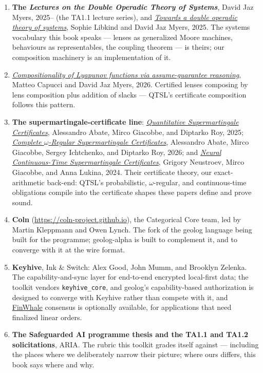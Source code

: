 \begin{enumerate}
  \item \textbf{The \emph{Lectures on the Double Operadic Theory of
    Systems}}, David Jaz Myers, 2025-- (the TA1.1 lecture series), and
    \href{https://arxiv.org/abs/2505.18329}{\emph{Towards a double
    operadic theory of systems}}, Sophie Libkind and David Jaz Myers,
    2025. The systems vocabulary this book speaks --- lenses as
    generalized Moore machines, behaviours as representables, the
    coupling theorem --- is theirs; our composition machinery is an
    implementation of it.
  \item \href{https://arxiv.org/abs/2604.03017}{\emph{Compositionality
    of Lyapunov functions via assume-guarantee reasoning}}, Matteo
    Capucci and David Jaz Myers, 2026. Certified lenses composing by
    lens composition plus addition of slacks --- QTSL's certificate
    composition follows this pattern.
  \item \textbf{The supermartingale-certificate line}:
    \href{https://arxiv.org/abs/2504.05065}{\emph{Quantitative
    Supermartingale Certificates}}, Alessandro Abate, Mirco Giacobbe,
    and Diptarko Roy, 2025;
    \href{https://arxiv.org/abs/2605.21134}{\emph{Complete
    $\omega$-Regular Supermartingale Certificates}}, Alessandro Abate,
    Mirco Giacobbe, Sergey Ichtchenko, and Diptarko Roy, 2026; and
    \href{https://arxiv.org/abs/2412.17432}{\emph{Neural
    Continuous-Time Supermartingale Certificates}}, Grigory Neustroev,
    Mirco Giacobbe, and Anna Lukina, 2024. Their certificate theory,
    our exact-arithmetic back-end: QTSL's probabilistic,
    $\omega$-regular, and continuous-time obligations compile into
    the certificate shapes these papers define and prove
    sound.
  \item \textbf{Coln} (\url{https://coln-project.github.io}), the
    Categorical Core team, led by Martin Kleppmann and Owen Lynch.
    The fork of the geolog language being built for the
    programme; geolog-alpha is built to complement it, and to
    converge with it at the wire format.
  \item \textbf{Keyhive}, Ink \& Switch: Alex Good, John Mumm, and
    Brooklyn Zelenka. The capability-and-sync layer for end-to-end
    encrypted local-first data; the toolkit vendors
    \texttt{keyhive\_core}, and geolog's capability-based
    authorization is designed to converge with Keyhive rather than
    compete with it, and
    \href{https://arxiv.org/abs/2606.26292}{FinWhale} consensus is
    optionally available, for applications that need finalized
    linear orders.
  \item \textbf{The Safeguarded AI programme thesis and the TA1.1
    and TA1.2 solicitations}, ARIA. The rubric this toolkit grades itself
    against --- including the places where we deliberately narrow
    their picture; where ours differs, this book says where and why.
\end{enumerate}

